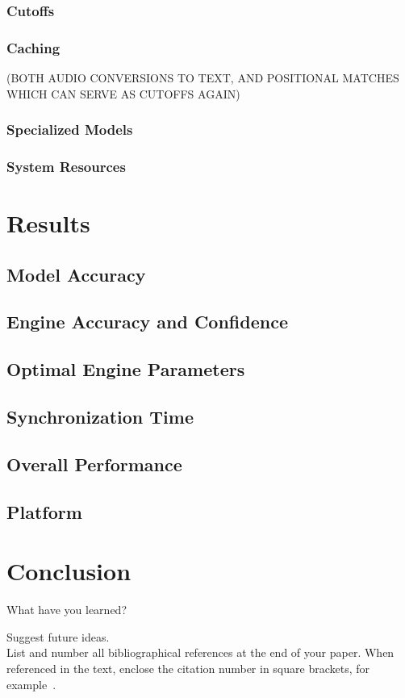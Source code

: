 \documentclass[10pt,twocolumn,letterpaper]{article}
\begin{document}
\subsubsection{Cutoffs}
\subsubsection{Caching}
(BOTH AUDIO CONVERSIONS TO TEXT, AND POSITIONAL MATCHES WHICH CAN SERVE AS CUTOFFS AGAIN)
\subsubsection{Specialized Models}
\subsubsection{System Resources}

\section{Results}
\subsection{Model Accuracy}
\subsection{Engine Accuracy and Confidence}
\subsection{Optimal Engine Parameters}
\subsection{Synchronization Time}
\subsection{Overall Performance}
\subsection{Platform}

\section{Conclusion}
What have you learned?

Suggest future ideas.\\

List and number all bibliographical references at the end of your paper. When referenced in the text,
enclose the citation number in square brackets, for
example~\cite{Alpher04}.

{\small


}
\end{document}
